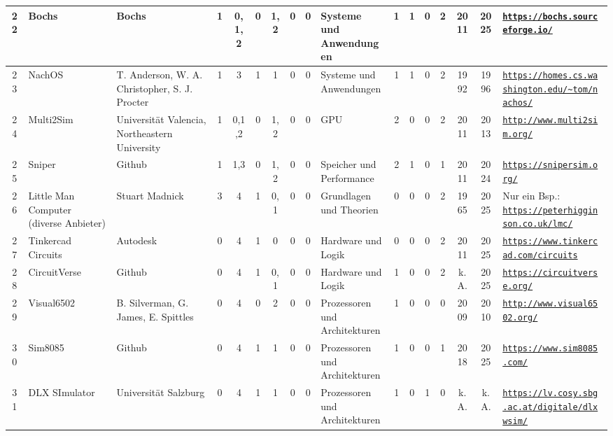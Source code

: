 \begin{landscape}
\begin{longtable}{|c|p{1cm}|p{1.3cm}|c|c|c|c|c|c|p{1.3cm}|c|c|c|c|c|c|p{2cm}|}
    22 & Bochs & Bochs & 1 & 0,1,2 & 0 & 1,2 & 0 & 0 & Systeme und Anwendungen & 1 & 1 & 0 & 2 & 2011 & 2025 & \href{https://bochs.sourceforge.io/}{\nolinkurl{https://bochs.sourceforge.io/}} \\ \hline
    23 & NachOS & T. Anderson, W. A. Christopher, S. J. Procter & 1 & 3 & 1 & 1 & 0 & 0 & Systeme und Anwendungen & 1 & 1 & 0 & 2 & 1992 & 1996 & \href{https://homes.cs.washington.edu/\~tom/nachos/}{\nolinkurl{https://homes.cs.washington.edu/\~tom/nachos/}} \\ \hline
    24 & Multi2Sim & Universität Valencia, Northeastern University & 1 & 0,1,2 & 0 & 1,2 & 0 & 0 & GPU & 2 & 0 & 0 & 2 & 2011 & 2013 & \href{http://www.multi2sim.org/}{\nolinkurl{http://www.multi2sim.org/}} \\ \hline
    25 & Sniper & Github & 1 & 1,3 & 0 & 1,2 & 0 & 0 & Speicher und Performance & 2 & 1 & 0 & 1 & 2011 & 2024 & \href{https://snipersim.org/}{\nolinkurl{https://snipersim.org/}}\\ \hline
    26 & Little Man Computer (diverse Anbieter) & Stuart Madnick & 3 & 4 & 1 & 0,1 & 0 & 0 & Grundlagen und Theorien & 0 & 0 & 0 & 2 & 1965 & 2025 & Nur ein Bsp.: \href{https://peterhigginson.co.uk/lmc/}{\nolinkurl{https://peterhigginson.co.uk/lmc/}} \\ \hline
    27 & Tinkercad Circuits & Autodesk & 0 & 4 & 1 & 0 & 0 & 0 & Hardware und Logik & 0 & 0 & 0 & 2 & 2011 & 2025 & \href{https://www.tinkercad.com/circuits}{\nolinkurl{https://www.tinkercad.com/circuits}} \\ \hline
    28 & CircuitVerse & Github & 0 & 4 & 1 & 0,1 & 0 & 0 & Hardware und Logik & 1 & 0 & 0 & 2 & k.A. & 2025 & \href{https://circuitverse.org/}{\nolinkurl{https://circuitverse.org/}} \\ \hline
    29 & Visual6502 & B. Silverman, G. James, E. Spittles & 0 & 4 & 0 & 2 & 0 & 0 & Prozessoren und Architekturen & 1 & 0 & 0 & 0 & 2009 & 2010 & \href{http://www.visual6502.org/}{\nolinkurl{http://www.visual6502.org/}} \\ \hline
    30 & Sim8085 & Github & 0 & 4 & 1 & 1 & 0 & 0 & Prozessoren und Architekturen & 1 & 0 & 0 & 1 & 2018 & 2025 & \href{https://www.sim8085.com/}{\nolinkurl{https://www.sim8085.com/}} \\ \hline
    31 & DLX SImulator & Universität Salzburg & 0 & 4 & 1 & 1 & 0 & 0 & Prozessoren und Architekturen & 1 & 0 & 1 & 0 & k.A. & k.A. & \href{https://lv.cosy.sbg.ac.at/digitale/dlxwsim/}{\nolinkurl{https://lv.cosy.sbg.ac.at/digitale/dlxwsim/}} \\ \hline

\end{longtable}
\end{landscape}
